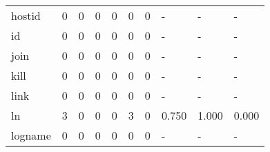 \begin{longtable}{lp{2.0cm}p{2.0cm}p{2.0cm}p{2.0cm}p{2.0cm}p{2.0cm}p{2.0cm}p{2.0cm}p{2.0cm}}
hostid    &                      0 &                                             0 &                                            0 &                                           0 &                                            0 &                                          0 &                                    - &                                      - &                                    - \\
id        &                      0 &                                             0 &                                            0 &                                           0 &                                            0 &                                          0 &                                    - &                                      - &                                    - \\
join      &                      0 &                                             0 &                                            0 &                                           0 &                                            0 &                                          0 &                                    - &                                      - &                                    - \\
kill      &                      0 &                                             0 &                                            0 &                                           0 &                                            0 &                                          0 &                                    - &                                      - &                                    - \\
link      &                      0 &                                             0 &                                            0 &                                           0 &                                            0 &                                          0 &                                    - &                                      - &                                    - \\
ln        &                      3 &                                             0 &                                            0 &                                           0 &                                            3 &                                          0 &                                0.750 &                                  1.000 &                                0.000 \\
logname   &                      0 &                                             0 &                                            0 &                                           0 &                                            0 &                                          0 &                                    - &                                      - &                                    - \\

\end{longtable}
